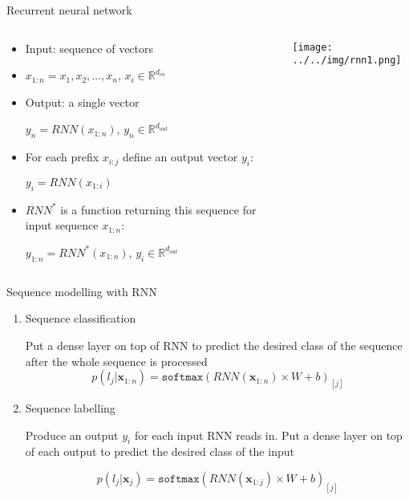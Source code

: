 \documentclass[usenames,dvipsnames,handout,aspectratio=169]{beamer}
\begin{document}
\begin{frame}{Recurrent neural network}	
\begin{columns}
\begin{column}{0.6\textwidth}

\begin{itemize}
	
\item  Input: sequence of vectors 
\item 
$x_{1:n} = x_1, x_2, \ldots, x_n$, $x_i \in \mathbb{R}^{d_{in}}$

\item  Output: a single vector

 $y_n = RNN(x_{1:n})$, $y_n \in \mathbb{R}^{d_{out}}$

\item For each prefix $x_{i:j}$ define an output vector $y_i$:

$y_i = RNN(x_{1:i})$

\item $RNN^{*}$ is a function returning this sequence for input sequence $x_{1:n}$:

$y_{1:n} = RNN^{*}(x_{1:n})$, $y_i \in \mathbb{R}^{d_{out}}$

\end{itemize}

\end{column}
\begin{column}{0.4\textwidth}  %
    \begin{center}
	\texttt{[image: ../../img/rnn1.png]}
     \end{center}
\end{column}
\end{columns}
\end{frame}


\begin{frame}{Sequence modelling with RNN}

\begin{enumerate}

	\item Sequence classification  

Put a dense layer on top of RNN to predict the desired class of the sequence after the whole sequence is processed 
\[ p( l_j | \bm{x}_{1:n} ) = \texttt{softmax} (RNN(\bm{x}_{1:n}) \times W + b)_{[j]} \]


	\item Sequence labelling 
	
Produce an output $y_i$ for each input RNN reads in. Put a dense layer on top of each output to predict the desired class of the input

\[ p( l_j | \bm{x}_{j}  ) = \texttt{softmax} (RNN(\bm{x}_{1:j}) \times W + b)_{[j]} \]


\end{enumerate}
	
\end{frame}
\end{document}
